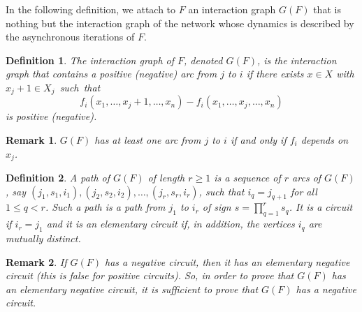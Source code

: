 \documentclass[11pt]{article}
\newtheorem{definition}{Definition}
\newtheorem{remark}{Remark}
\begin{document}
In the following definition, we attach to $F$ an interaction graph
$G(F)$ that is nothing but the interaction graph of the network whose
dynamics is described by the asynchronous iterations of $F$.

\begin{definition}
The {\emph{interaction graph of $F$}}, denoted $G(F)$, is the
interaction graph that contains a positive (negative) arc from $j$ to
$i$ if there exists $x \in X$ with $x_j+1\in X_j$~such~that
\[
f_i(x_1,\dots,x_j+1,\dots,x_n)-f_i(x_1,\dots,x_j,\dots,x_n)
\]
is positive (negative).
\end{definition}


\begin{remark}
{\emph{$G(F)$ has at least one arc from $j$ to $i$ if and only if
$f_i$ depends on $x_j$.}}
\end{remark}


\begin{definition}
A {\emph{path of $G(F)$}} of length $r\geq 1$ is a sequence of $r$
arcs of $G(F)$, say $(j_1,s_1,i_1),(j_2,s_2,i_2),\dots,(j_r,s_r,i_r)$,
such that $i_q=j_{q+1}$ for all $1\leq q<r$. Such a path is a path
{\emph{from $j_1$ to $i_r$}} of {\emph{sign}} $s=\prod_{q=1}^r
s_q$. It is a {\emph{circuit}} if $i_r=j_1$ and it is an
{\emph{elementary circuit}} if, in addition, the vertices $i_q$ are
mutually distinct.
\end{definition}


\begin{remark}
{\emph{If $G(F)$ has a negative circuit, then it has an elementary
negative circuit (this is false for positive circuits). So, in order
to prove that $G(F)$ has an elementary negative circuit, it is
sufficient to prove that $G(F)$ has a negative circuit.}}
\end{remark}
\end{document}
